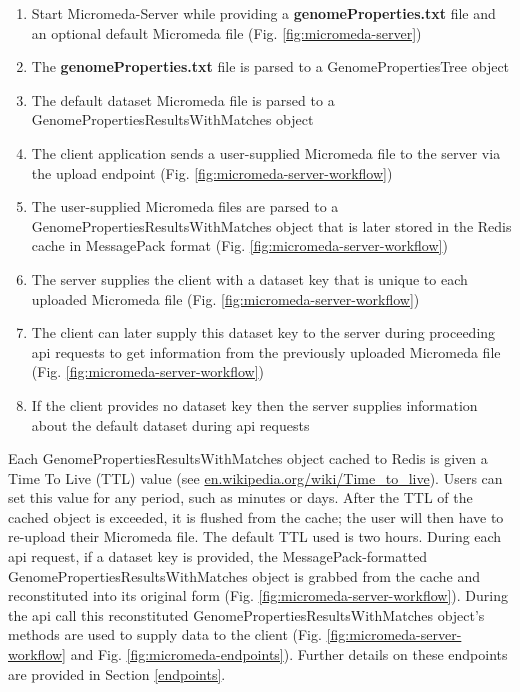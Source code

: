 \begin{enumerate}
  \item Start Micromeda-Server while providing a \textbf{genomeProperties.txt} file and an optional default Micromeda file (Fig. \ref{fig:micromeda-server})
  \item The \textbf{genomeProperties.txt} file is parsed to a GenomePropertiesTree object
  \item The default dataset Micromeda file is parsed to a GenomePropertiesResultsWithMatches object  
  \item The client application sends a user-supplied Micromeda file to the server via the upload endpoint (Fig. \ref{fig:micromeda-server-workflow})
  \item The user-supplied Micromeda files are parsed to a GenomePropertiesResultsWithMatches object that is later stored in the Redis cache in MessagePack format (Fig. \ref{fig:micromeda-server-workflow})
  \item The server supplies the client with a dataset key that is unique to each uploaded Micromeda file (Fig. \ref{fig:micromeda-server-workflow})
  \item The client can later supply this dataset key to the server during proceeding \gls{api} requests to get information from the previously uploaded Micromeda file (Fig. \ref{fig:micromeda-server-workflow})
  \item If the client provides no dataset key then the server supplies information about the default dataset during \gls{api} requests
\end{enumerate}

Each GenomePropertiesResultsWithMatches object cached to Redis is given a Time To Live (TTL) value \cite{gwertzman1996world} (see \href{en.wikipedia.org/wiki/Time\_to\_live}{en.wikipedia.org/wiki/Time\_to\_live}). Users can set this value for any period, such as minutes or days. After the TTL of the cached object is exceeded, it is flushed from the cache; the user will then have to re-upload their Micromeda file. The default TTL used is two hours. During each \gls{api} request, if a dataset key is provided, the MessagePack-formatted GenomePropertiesResultsWithMatches object is grabbed from the cache and reconstituted into its original form (Fig. \ref{fig:micromeda-server-workflow}). During the \gls{api} call this reconstituted GenomePropertiesResultsWithMatches object's methods are used to supply data to the client  (Fig. \ref{fig:micromeda-server-workflow} and Fig. \ref{fig:micromeda-endpoints}). Further details on these endpoints are provided in Section \ref{endpoints}.

